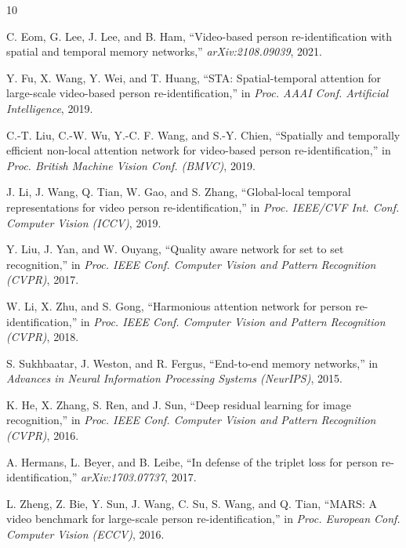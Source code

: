 \documentclass[conference]{IEEEtran}
\begin{document}
\begin{thebibliography}{10}

C. Eom, G. Lee, J. Lee, and B. Ham,
``Video-based person re-identification with spatial and temporal memory networks,''
\textit{arXiv:2108.09039}, 2021.

Y. Fu, X. Wang, Y. Wei, and T. Huang,
``STA: Spatial-temporal attention for large-scale video-based person re-identification,''
in \textit{Proc. AAAI Conf. Artificial Intelligence}, 2019.

C.-T. Liu, C.-W. Wu, Y.-C. F. Wang, and S.-Y. Chien,
``Spatially and temporally efficient non-local attention network for video-based person re-identification,''
in \textit{Proc. British Machine Vision Conf. (BMVC)}, 2019.

J. Li, J. Wang, Q. Tian, W. Gao, and S. Zhang,
``Global-local temporal representations for video person re-identification,''
in \textit{Proc. IEEE/CVF Int. Conf. Computer Vision (ICCV)}, 2019.

Y. Liu, J. Yan, and W. Ouyang,
``Quality aware network for set to set recognition,''
in \textit{Proc. IEEE Conf. Computer Vision and Pattern Recognition (CVPR)}, 2017.

W. Li, X. Zhu, and S. Gong,
``Harmonious attention network for person re-identification,''
in \textit{Proc. IEEE Conf. Computer Vision and Pattern Recognition (CVPR)}, 2018.

S. Sukhbaatar, J. Weston, and R. Fergus,
``End-to-end memory networks,''
in \textit{Advances in Neural Information Processing Systems (NeurIPS)}, 2015.

K. He, X. Zhang, S. Ren, and J. Sun,
``Deep residual learning for image recognition,''
in \textit{Proc. IEEE Conf. Computer Vision and Pattern Recognition (CVPR)}, 2016.

A. Hermans, L. Beyer, and B. Leibe,
``In defense of the triplet loss for person re-identification,''
\textit{arXiv:1703.07737}, 2017.

L. Zheng, Z. Bie, Y. Sun, J. Wang, C. Su, S. Wang, and Q. Tian,
``MARS: A video benchmark for large-scale person re-identification,''
in \textit{Proc. European Conf. Computer Vision (ECCV)}, 2016.

\end{thebibliography}
\end{document}
